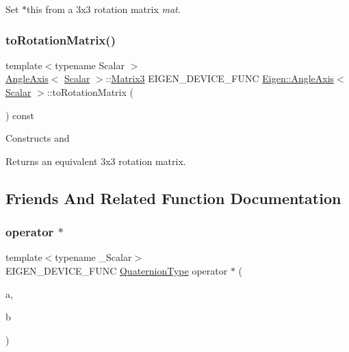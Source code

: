 Set {\ttfamily $\ast$this} from a 3x3 rotation matrix {\itshape mat}. \mbox{\label{class_eigen_1_1_angle_axis_a750ae6694e576bc6c49b635b56ef5306}} 
\subsubsection{\texorpdfstring{toRotationMatrix()}{toRotationMatrix()}}
{\footnotesize\ttfamily template$<$typename Scalar $>$ \\
\mbox{\hyperlink{class_eigen_1_1_angle_axis}{Angle\+Axis}}$<$ \mbox{\hyperlink{class_eigen_1_1_angle_axis_acd9b10692d7d726b28670e4d3a282fe8}{Scalar}} $>$\+::\mbox{\hyperlink{class_eigen_1_1_matrix}{Matrix3}} E\+I\+G\+E\+N\+\_\+\+D\+E\+V\+I\+C\+E\+\_\+\+F\+U\+NC \mbox{\hyperlink{class_eigen_1_1_angle_axis}{Eigen\+::\+Angle\+Axis}}$<$ \mbox{\hyperlink{class_eigen_1_1_angle_axis_acd9b10692d7d726b28670e4d3a282fe8}{Scalar}} $>$\+::to\+Rotation\+Matrix (\begin{DoxyParamCaption}\item[{void}]{ }\end{DoxyParamCaption}) const}

Constructs and \begin{DoxyReturn}{Returns}
an equivalent 3x3 rotation matrix. 
\end{DoxyReturn}


\subsection{Friends And Related Function Documentation}
\mbox{\label{class_eigen_1_1_angle_axis_a1412c320ba2c12c3cd3746f796d1dc11}} 
\subsubsection{\texorpdfstring{operator $\ast$}{operator *}}
{\footnotesize\ttfamily template$<$typename \+\_\+\+Scalar$>$ \\
E\+I\+G\+E\+N\+\_\+\+D\+E\+V\+I\+C\+E\+\_\+\+F\+U\+NC \mbox{\hyperlink{class_eigen_1_1_quaternion}{Quaternion\+Type}} operator $\ast$ (\begin{DoxyParamCaption}\item[{const \mbox{\hyperlink{class_eigen_1_1_quaternion}{Quaternion\+Type}} \&}]{a,  }\item[{const \mbox{\hyperlink{class_eigen_1_1_angle_axis}{Angle\+Axis}}$<$ \+\_\+\+Scalar $>$ \&}]{b }\end{DoxyParamCaption})\hspace{0.3cm}{\ttfamily [friend]}}

